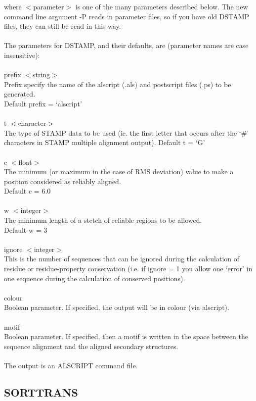 where $<$parameter$>$ is one of the many parameters described below.
The new command line argument -P reads in parameter files, so if 
you have old DSTAMP files, they can still be read in this way. \\
\\
The parameters for DSTAMP, and their defaults, are (parameter names
are case insensitive):\\
\\
prefix $<$string$>$ \\
Prefix specify the name of the alscript (.als) and postscript files (.ps)
to be generated.\\
Default prefix = `alscript'\\
\\
t  $<$character$>$\\
The type of STAMP data to be used (ie. the first letter that 
occurs after the `\#' characters in STAMP multiple alignment
output).
Default t = `G'\\
\\
c  $<$float$>$ \\
The minimum (or maximum in the case of RMS deviation) value to make
a position considered as reliably aligned.\\
Default c = 6.0\\
\\
w     $<$integer$>$ \\
The minimum length of a stetch of reliable regions to be allowed.\\
Default w = 3\\
\\
ignore $<$integer$>$\\
This is the number of sequences that can be ignored during the calculation
of residue or residue-property conservation (i.e. if ignore = 1 you allow
one `error' in one sequence during the calculation of conserved positions).\\
\\
colour\\
Boolean parameter.  If specified, the output will be in colour (via alscript).\\
\\
motif\\
Boolean parameter.  If specified, then a motif is written in the space between
the sequence alignment and the aligned secondary structures.\\
\\
The output is an ALSCRIPT command file.

\subsection{SORTTRANS}

